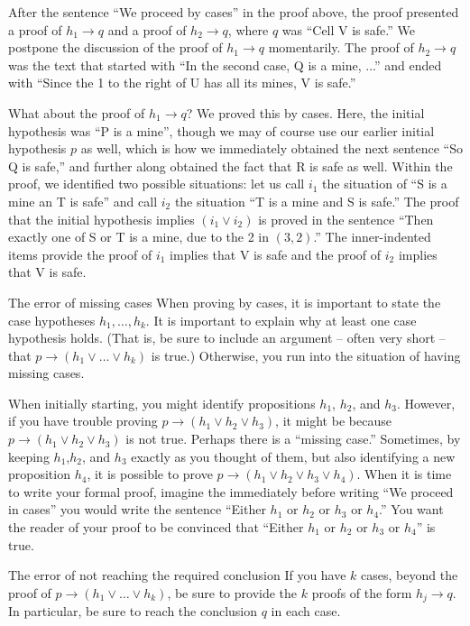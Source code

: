 \documentclass{book}
\theoremstyle{ekimcustom}
\begin{document}
After the sentence ``We proceed by cases'' in the proof above, the proof presented a proof of $h_1 \rightarrow q$ and a proof of $h_2 \rightarrow q$, where $q$ was ``Cell V is safe.'' We postpone the discussion of the proof of $h_1 \rightarrow q$ momentarily. The proof of $h_2 \rightarrow q$ was the text that started with ``In the second case, Q is a mine, ...'' and ended with ``Since the 1 to the right of U has all its mines, V is safe.''

What about the proof of $h_1 \rightarrow q$? We proved this by cases. Here, the initial hypothesis was ``P is a mine'', though we may of course use our earlier initial hypothesis $p$ as well, which is how we immediately obtained the next sentence ``So Q is safe,'' and further along obtained the fact that R is safe as well. Within the proof, we identified two possible situations: let us call $i_1$ the situation of ``S is a mine an T is safe'' and call $i_2$ the situation ``T is a mine and S is safe.'' The proof that the initial hypothesis implies $(i_1 \vee i_2)$ is proved in the sentence ``Then exactly one of S or T is a mine, due to the 2 in $(3,2)$.'' The inner-indented items provide the proof of $i_1$ implies that V is safe and the proof of $i_2$ implies that V is safe.

\begin{bwarning}{The error of missing cases}{}
When proving by cases, it is important to state the case hypotheses $h_1,\dots,h_k$. It is important to explain why at least one case hypothesis holds. (That is, be sure to include an argument -- often very short -- that $p \rightarrow (h_1 \vee \dots \vee h_k)$ is true.) Otherwise, you run into the situation of having missing cases.
\end{bwarning}
When initially starting, you might identify propositions $h_1$, $h_2$, and $h_3$. However, if you have trouble proving $p \rightarrow (h_1 \vee h_2 \vee h_3)$, it might be because $p \rightarrow (h_1 \vee h_2 \vee h_3)$ is not true. Perhaps there is a ``missing case.'' Sometimes, by keeping $h_1$,$h_2$, and $h_3$ exactly as you thought of them, but also identifying a new proposition $h_4$, it is possible to prove $p \rightarrow (h_1 \vee h_2 \vee h_3 \vee h_4)$. When it is time to write your formal proof, imagine the immediately before writing ``We proceed in cases'' you would write the sentence ``Either $h_1$ or $h_2$ or $h_3$ or $h_4$.'' You want the reader of your proof to be convinced that ``Either $h_1$ or $h_2$ or $h_3$ or $h_4$'' is true.

\begin{bwarning}{The error of not reaching the required conclusion}{}
If you have $k$ cases, beyond the proof of $p \rightarrow (h_1 \vee \dots \vee h_k)$, be sure to provide the $k$ proofs of the form $h_j \rightarrow q$. In particular, be sure to reach the conclusion $q$ in each case.
\end{bwarning}
\end{document}
